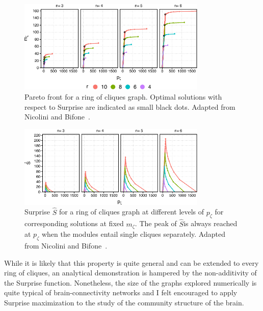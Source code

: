 \begin{figure}[htb!]
\centering
\includegraphics[width=0.8\textwidth]{images/ring_cliques_pareto.pdf}
\caption{Pareto front for a ring of cliques graph. Optimal solutions with respect to Surprise are indicated as small black dots. Adapted from Nicolini and Bifone~\cite{nicolini2016}.}
\label{fig:ring_cliques_pareto}
\end{figure}
\begin{figure}[htb!]
\centering
\includegraphics[width=0.8\textwidth]{images/ring_cliques_surprise.pdf}
\caption{Surprise $\hat{S}$ for a ring of cliques graph at different levels of $p_\zeta$ for corresponding solutions at fixed $m_\zeta$. The peak of $\hat{S} $is always reached at $p_\zeta$ when the modules entail single cliques separately. Adapted from Nicolini and Bifone~\cite{nicolini2016}.}
\label{fig:ring_cliques_surprise}
\end{figure}
While it is likely that this property is quite general and can be extended to every ring of cliques, an analytical demonstration is hampered by the non-additivity of the Surprise function.
Nonetheless, the size of the graphs explored numerically is quite typical of brain-connectivity networks and I felt encouraged to apply Surprise maximization to the study of the community structure of the brain.

